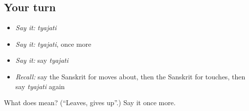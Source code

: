 \subsection*{Your turn}
\begin{itemize}
\raggedright
  \item \emph{Say it:} \emph{tyajati}
  \item \emph{Say it:} \emph{tyajati}, once more
  \item \emph{Say it:} say \emph{tyajati}
  \item \emph{Recall:} say the Sanskrit for moves about, then the Sanskrit for touches, then say \emph{tyajati} again
\end{itemize}

\begin{tcolorbox}[breakable,colback=teal!4,colframe=teal!35!black,title={Before you move on}]
What does  mean? (\textquotedblleft{}Leaves, gives up\textquotedblright{}.) Say it once more.
\end{tcolorbox}
